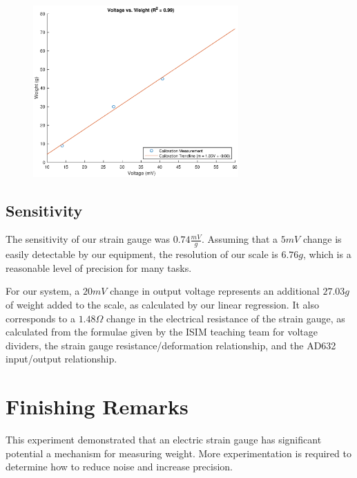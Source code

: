 \documentclass[11pt]{article}
\begin{document}
\begin{figure}[!ht]
	\centering 
	\includegraphics[width=0.7\textwidth]{weights.eps}
	\caption{}
	\label{fig:weights}
\end{figure}

\subsection{Sensitivity}

The sensitivity of our strain gauge was $0.74\frac{mV}{g}$. Assuming that a $5mV$ change is easily detectable by our equipment, the resolution of our scale is $6.76g$, which is a reasonable level of precision for many tasks.

For our system, a $20mV$ change in output voltage represents an additional $27.03g$ of weight added to the scale, as calculated by our linear regression. It also corresponds to a $1.48\Omega$ change in the electrical resistance of the strain gauge, as calculated from the formulae given by the ISIM teaching team for voltage dividers, the strain gauge resistance/deformation relationship, and the AD632 input/output relationship.

\section{Finishing Remarks}
This experiment demonstrated that an electric strain gauge has significant potential a mechanism for measuring weight. More experimentation is required to determine how to reduce noise and increase precision.
\end{document}
